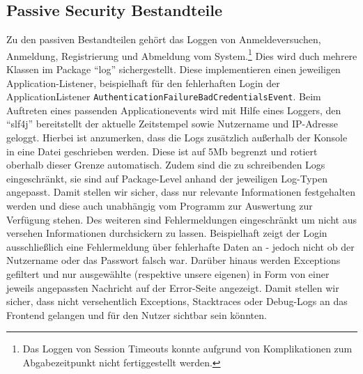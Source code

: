 \subsection{Passive Security Bestandteile}
Zu den passiven Bestandteilen gehört das Loggen von Anmeldeversuchen, Anmeldung, Registrierung und Abmeldung vom System.\footnote{Das Loggen von Session Timeouts konnte aufgrund von Komplikationen zum Abgabezeitpunkt nicht fertiggestellt werden.}
Dies wird duch mehrere Klassen im Package \enquote{log} sichergestellt. Diese implementieren einen jeweiligen Application-Listener, beispielhaft für den fehlerhaften Login der ApplicationListener \texttt{AuthenticationFailureBadCredentialsEvent}. Beim Auftreten eines passenden Applicationevents wird mit Hilfe eines Loggers, den \enquote{slf4j} bereitstellt der aktuelle Zeitstempel sowie Nutzername und IP-Adresse geloggt.
Hierbei ist anzumerken, dass die Logs zusätzlich außerhalb der Konsole in eine Datei geschrieben werden. Diese ist auf 5Mb begrenzt und rotiert oberhalb dieser Grenze automatisch.
Zudem sind die zu schreibenden Logs eingeschränkt, sie sind auf Package-Level anhand der jeweiligen Log-Typen angepasst.
Damit stellen wir sicher, dass nur relevante Informationen festgehalten werden und diese auch unabhängig vom Programm zur Auswertung zur Verfügung stehen.
Des weiteren sind Fehlermeldungen eingeschränkt um nicht aus versehen Informationen durchsickern zu lassen. Beispielhaft zeigt der Login ausschließlich eine Fehlermeldung über fehlerhafte Daten an - jedoch nicht ob der Nutzername oder das Passwort falsch war.
Darüber hinaus werden Exceptions gefiltert und nur ausgewählte (respektive unsere eigenen) in Form von einer jeweils angepassten Nachricht auf der Error-Seite angezeigt. Damit stellen wir sicher, dass nicht versehentlich Exceptions, Stacktraces oder Debug-Logs an das Frontend gelangen und für den Nutzer sichtbar sein könnten.
